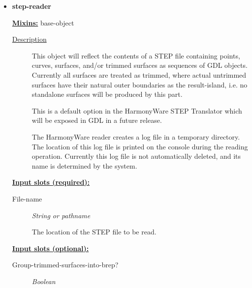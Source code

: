 \documentclass [11pt]{book}
\begin{document}
\begin{itemize}
\item {}
\label{prim:step-reader}
\textbf{step-reader}


\textbf{
\underline{Mixins:}} base-object





\begin{description}

\item [
\underline{Description}]


This object will reflect the contents of a STEP file containing
points, curves, surfaces, and/or trimmed surfaces as sequences of GDL objects. Currently all
surfaces are treated as trimmed, where actual untrimmed surfaces have their natural outer 
boundaries as the result-island, i.e. no standalone surfaces will be produced by this part. 

This is a default option in the HarmonyWare STEP Translator which will be exposed in GDL
in a future release.

The HarmonyWare reader creates a log file in a temporary directory. The location of this log
file is printed on the console during the reading operation. Currently this log file is
not automatically deleted, and its name is determined by the system.





\end{description}








\textbf{
\underline{Input slots (required):}}

\begin{description}

\item [File-name]
\emph{String or pathname}

 The location of the STEP file to be read.




\end{description}






\textbf{
\underline{Input slots (optional):}}

\begin{description}

\item [Group-trimmed-surfaces-into-brep?]
\emph{Boolean}


\end{description}
\end{itemize}
\end{document}
